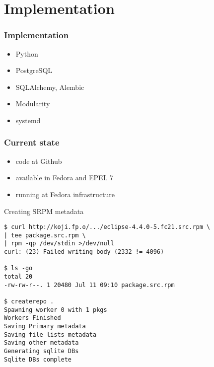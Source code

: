 \documentclass[pdftex,unicode,xcolor=table]{beamer}
\begin{document}
\section{Implementation}
\begin{frame}
  \frametitle{Implementation}
  \begin{itemize}
    \item Python
    \item PostgreSQL
    \item SQLAlchemy, Alembic
    \item Modularity
    \item systemd
  \end{itemize}
\end{frame}

\begin{frame}
  \frametitle{Current state}
  \begin{itemize}
    \item code at Github
    \item available in Fedora and EPEL 7
    \item running at Fedora infrastructure
  \end{itemize}
\end{frame}

\small
\begin{frame}[fragile]
\begin{block}{Creating SRPM metadata}
\begin{verbatim}
$ curl http://koji.fp.o/.../eclipse-4.4.0-5.fc21.src.rpm \
| tee package.src.rpm \
| rpm -qp /dev/stdin >/dev/null
curl: (23) Failed writing body (2332 != 4096)

$ ls -go
total 20
-rw-rw-r--. 1 20480 Jul 11 09:10 package.src.rpm

$ createrepo .
Spawning worker 0 with 1 pkgs
Workers Finished
Saving Primary metadata
Saving file lists metadata
Saving other metadata
Generating sqlite DBs
Sqlite DBs complete
\end{verbatim}
\end{block}
\end{frame}
\end{document}
